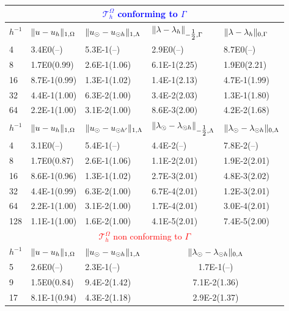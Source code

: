 \documentclass[r]{siamart171218}
\begin{document}
\begin{table}
  \scriptsize{
  \begin{center}
    \begin{tabular}{l|llll}
\hline
\multicolumn{5}{c}{\textcolor{blue}{$\mathcal{T}^{\Omega}_h$ conforming to $\Gamma$}}\\
\hline
    $h^{-1}$ & $\lVert{u-u_h}\rVert_{1, \Omega}$ & $\lVert{u_{\odot}-u_{\odot h}}\rVert_{1, \Lambda}$ & $\lVert{\lambda-\lambda_h}\rVert_{-\tfrac{1}{2},\Gamma}$ & $\lVert{\lambda-\lambda_h}\rVert_{0,\Gamma}$\\
      \hline
4  & 3.4E0(--)    & 5.3E-1(--)   & 2.9E0(--)    &8.7E0(--)    \\
8  & 1.7E0(0.99)  & 2.6E-1(1.06) & 6.1E-1(2.25) &1.9E0(2.21)  \\
16 & 8.7E-1(0.99) & 1.3E-1(1.02) & 1.4E-1(2.13) &4.7E-1(1.99) \\
32 & 4.4E-1(1.00) & 6.3E-2(1.00) & 3.4E-2(2.03) &1.3E-1(1.80) \\
64 & 2.2E-1(1.00) & 3.1E-2(1.00) & 8.6E-3(2.00) &4.2E-2(1.68) \\
\hline
$h^{-1}$ & $\lVert{u-u_h}\rVert_{1, \Omega}$ & $\lVert{u_{\odot}-u_{\odot h^{\prime}}}\rVert_{1, \Lambda}$ & $\lVert{\lambda_{\odot}-\lambda_{\odot h}}\rVert_{-\tfrac{1}{2}, \Lambda}$ & $\lVert{\lambda_{\odot}-\lambda_{\odot h}}\rVert_{0, \Lambda}$\\
\hline
4   & 3.1E0(--)    & 5.4E-1(--)   & 4.4E-2(--)   & 7.8E-2(--)  \\
8   & 1.7E0(0.87)  & 2.6E-1(1.06) & 1.1E-2(2.01) & 1.9E-2(2.01)\\
16  & 8.6E-1(0.96) & 1.3E-1(1.02) & 2.7E-3(2.01) & 4.8E-3(2.02)\\
32  & 4.4E-1(0.99) & 6.3E-2(1.00) & 6.7E-4(2.01) & 1.2E-3(2.01)\\
64  & 2.2E-1(1.00) & 3.1E-2(1.00) & 1.7E-4(2.01) & 3.0E-4(2.01)\\
128 & 1.1E-1(1.00) & 1.6E-2(1.00) & 4.1E-5(2.01) & 7.4E-5(2.00)\\
\hline
\multicolumn{5}{c}{\textcolor{red}{$\mathcal{T}^{\Omega}_h$ non conforming to $\Gamma$}}\\
\hline
    $h^{-1}$ & $\lVert{u-u_h}\rVert_{1, \Omega}$ & $\lVert{u_{\odot}-u_{\odot h}}\rVert_{1, \Lambda}$ & \multicolumn{2}{c}{$\lVert{\lambda_{\odot}-\lambda_{\odot h}}\rVert_{0,\Lambda}$}\\
      \hline
5   & 2.6E0(--)    & 2.3E-1(--)   & \multicolumn{2}{c}{1.7E-1(--)} \\ 
9   & 1.5E0(0.84)  & 9.4E-2(1.42) & \multicolumn{2}{c}{7.1E-2(1.36)}\\
17  & 8.1E-1(0.94) & 4.3E-2(1.18) & \multicolumn{2}{c}{2.9E-2(1.37)}\\

\end{tabular}
\end{center}}
\end{table}
\end{document}
